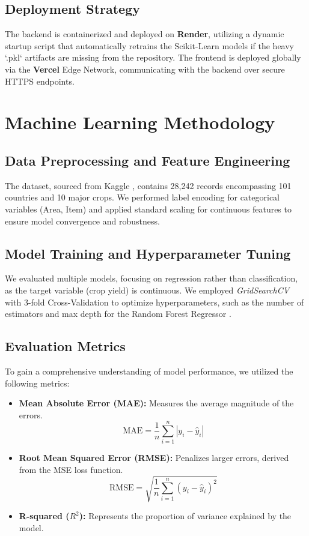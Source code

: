 \documentclass[12pt,a4paper]{article}
\begin{document}
\subsection{Deployment Strategy}
The backend is containerized and deployed on \textbf{Render}, utilizing a dynamic startup script that automatically retrains the Scikit-Learn models if the heavy `.pkl` artifacts are missing from the repository. The frontend is deployed globally via the \textbf{Vercel} Edge Network, communicating with the backend over secure HTTPS endpoints.

\section{Machine Learning Methodology}

\subsection{Data Preprocessing and Feature Engineering}
The dataset, sourced from Kaggle \cite{kaggle_dataset}, contains 28,242 records encompassing 101 countries and 10 major crops. We performed label encoding for categorical variables (Area, Item) and applied standard scaling for continuous features to ensure model convergence and robustness.

\subsection{Model Training and Hyperparameter Tuning}
We evaluated multiple models, focusing on regression rather than classification, as the target variable (crop yield) is continuous. We employed \textit{GridSearchCV} with 3-fold Cross-Validation to optimize hyperparameters, such as the number of estimators and max depth for the Random Forest Regressor \cite{scikit_learn}.

\subsection{Evaluation Metrics}
To gain a comprehensive understanding of model performance, we utilized the following metrics:
\begin{itemize}
    \item \textbf{Mean Absolute Error (MAE):} Measures the average magnitude of the errors.
    \begin{equation}
        \text{MAE} = \frac{1}{n} \sum_{i=1}^{n} |y_i - \hat{y}_i|
    \end{equation}
    
    \item \textbf{Root Mean Squared Error (RMSE):} Penalizes larger errors, derived from the MSE loss function.
    \begin{equation}
        \text{RMSE} = \sqrt{\frac{1}{n} \sum_{i=1}^{n} (y_i - \hat{y}_i)^2}
    \end{equation}
    
    \item \textbf{R-squared ($R^2$):} Represents the proportion of variance explained by the model.
\end{itemize}
\end{document}
